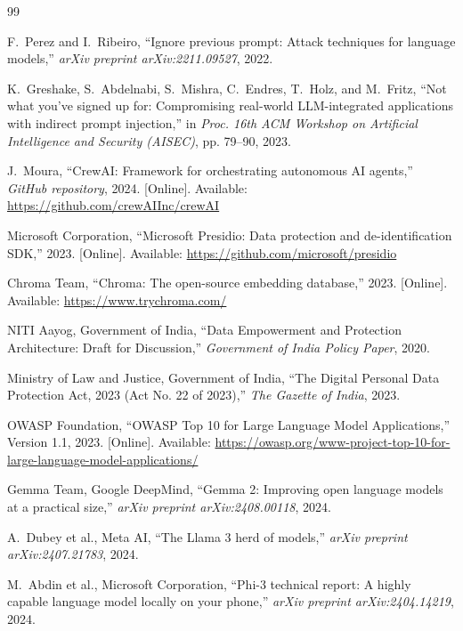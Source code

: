 \documentclass[11pt,a4paper]{article}
\begin{document}
\clearpage
\begin{thebibliography}{99}

F.~Perez and I.~Ribeiro, ``Ignore previous prompt: Attack techniques for language models,'' \textit{arXiv preprint arXiv:2211.09527}, 2022.

K.~Greshake, S.~Abdelnabi, S.~Mishra, C.~Endres, T.~Holz, and M.~Fritz, ``Not what you've signed up for: Compromising real-world LLM-integrated applications with indirect prompt injection,'' in \textit{Proc. 16th ACM Workshop on Artificial Intelligence and Security (AISEC)}, pp. 79--90, 2023.

J.~Moura, ``CrewAI: Framework for orchestrating autonomous AI agents,'' \textit{GitHub repository}, 2024. [Online]. Available: \url{https://github.com/crewAIInc/crewAI}

Microsoft Corporation, ``Microsoft Presidio: Data protection and de-identification SDK,'' 2023. [Online]. Available: \url{https://github.com/microsoft/presidio}

Chroma Team, ``Chroma: The open-source embedding database,'' 2023. [Online]. Available: \url{https://www.trychroma.com/}

NITI Aayog, Government of India, ``Data Empowerment and Protection Architecture: Draft for Discussion,'' \textit{Government of India Policy Paper}, 2020.

Ministry of Law and Justice, Government of India, ``The Digital Personal Data Protection Act, 2023 (Act No. 22 of 2023),'' \textit{The Gazette of India}, 2023.

OWASP Foundation, ``OWASP Top 10 for Large Language Model Applications,'' Version 1.1, 2023. [Online]. Available: \url{https://owasp.org/www-project-top-10-for-large-language-model-applications/}

Gemma Team, Google DeepMind, ``Gemma 2: Improving open language models at a practical size,'' \textit{arXiv preprint arXiv:2408.00118}, 2024.

A.~Dubey et al., Meta AI, ``The Llama 3 herd of models,'' \textit{arXiv preprint arXiv:2407.21783}, 2024.

M.~Abdin et al., Microsoft Corporation, ``Phi-3 technical report: A highly capable language model locally on your phone,'' \textit{arXiv preprint arXiv:2404.14219}, 2024.

\end{thebibliography}
\end{document}
